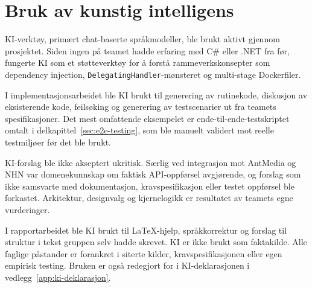 \section{Bruk av kunstig intelligens}
\label{sec:ai-bruk}

KI-verktøy, primært chat-baserte språkmodeller, ble brukt
aktivt gjennom prosjektet. Siden ingen på teamet hadde
erfaring med C\# eller .NET fra før, fungerte KI som et
støtteverktøy for å forstå rammeverkskonsepter som dependency
injection, \texttt{DelegatingHandler}-mønsteret og multi-stage
Dockerfiler.

I implementasjonsarbeidet ble KI brukt til generering av
rutinekode, diskusjon av eksisterende kode, feilsøking og
generering av testscenarier ut fra teamets spesifikasjoner.
Det mest omfattende eksempelet er ende-til-ende-testskriptet
omtalt i delkapittel~\ref{sec:e2e-testing}, som ble manuelt
validert mot reelle testmiljøer før det ble brukt.

KI-forslag ble ikke akseptert ukritisk. Særlig ved integrasjon
mot AntMedia og NHN var domenekunnskap om faktisk API-oppførsel
avgjørende, og forslag som ikke samsvarte med dokumentasjon,
kravspesifikasjon eller testet oppførsel ble forkastet.
Arkitektur, designvalg og kjernelogikk er resultatet av teamets
egne vurderinger.

I rapportarbeidet ble KI brukt til \LaTeX-hjelp, språkkorrektur
og forslag til struktur i tekst gruppen selv hadde skrevet.
KI er ikke brukt som faktakilde. Alle faglige påstander er
forankret i siterte kilder, kravspesifikasjonen eller egen
empirisk testing. Bruken er også redegjort for i
KI-deklarasjonen i vedlegg~\ref{app:ki-deklarasjon}.